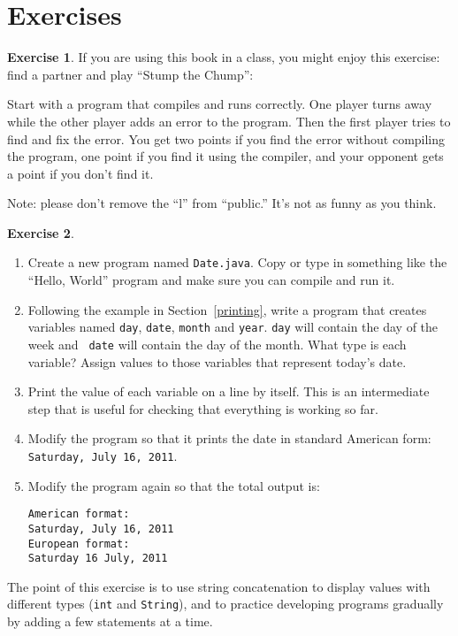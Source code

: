 \documentclass[12pt]{book}
\theoremstyle{definition}
\newtheorem{excz}{Exercise}[chapter]
\newenvironment{exercise}{\bigskip\begin{excz}\mbox{}}{\end{excz}}
\begin{document}
\section{Exercises}

\begin{exercise}

If you are using this book in a class, you might enjoy this exercise:
find a partner and play ``Stump the Chump'':  

Start with a program that compiles and runs correctly.  One player
turns away while the other player adds an error to the program.  Then
the first player tries to find and fix the error.  You get two points
if you find the error without compiling the program, one point if you
find it using the compiler, and your opponent gets a point if you
don't find it.

Note: please don't remove the ``l'' from ``public.''  It's not as
funny as you think.
\end{exercise}


\begin{exercise}
\label{ex.date}

\begin{enumerate}

\item Create a new program named {\tt Date.java}.  Copy or
type in something like the ``Hello, World'' program and make
sure you can compile and run it.

\item Following the example in Section~\ref{printing}, write a program
that creates variables named {\tt day}, {\tt date}, {\tt month}
and {\tt year}.  {\tt day} will contain the day of the week and {\tt
date} will contain the day of the month.  What type is each variable?
Assign values to those variables that represent today's date.

\item Print the value of each variable on a line by itself.  This is
an intermediate step that is useful for checking that everything is
working so far.

\item Modify the program so that it prints the date in standard
American form: {\tt Saturday, July 16, 2011}.

\item Modify the program again so that the total output is:

\begin{lstlisting}
American format:
Saturday, July 16, 2011
European format:
Saturday 16 July, 2011
\end{lstlisting}

\end{enumerate}

The point of this exercise is to use string concatenation to display
values with different types ({\tt int} and {\tt String}), and to
practice developing programs gradually by adding a few statements
at a time.

\end{exercise}
\end{document}
